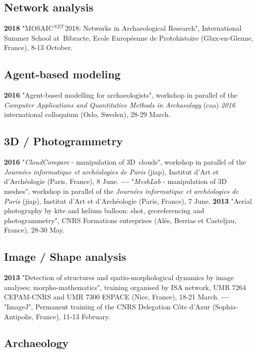 \documentclass[11pt]{report} %
\begin{document}
\subsection*{Network analysis}

\textbf{2018 }"MOSAIC${}^{NET\ }$2018: Networks in Archaeological Research", International Summer School at~Bibracte, Ecole Europ\'{e}enne de Protohistoire (Glux-en-Glenne, France), 8-13 October.

\subsection*{Agent-based modeling}

\textbf{2016 }"Agent-based modelling for archaeologists", workshop in parallel of the \textit{Computer Applications and Quantitative Methods in Archaeology }(caa) \textit{2016 }international colloquium (Oslo, Sweden), 28-29 March.

\subsection*{3D / Photogrammetry}

\textbf{2016 }"\textit{CloudCompare} - manipulation of 3D~clouds", workshop in parallel of the \textit{Journ\'{e}es informatique et arch\'{e}ologies de Paris} (jiap), Institut d'Art et d'Arch\'{e}ologie (Paris, France), 8 June.
\smallbreak
\textbf{---  }"\textit{MeshLab }- manipulation of 3D\textit{ }meshes", workshop in parallel of the \textit{Journ\'{e}es informatique et arch\'{e}ologies de Paris} (jiap), Institut d'Art et d'Arch\'{e}ologie (Paris, France), 7 June.
\smallbreak
\textbf{2013 }"Aerial photography by kite and helium balloon: shot, georeferencing and photogrammetry", CNRS Formations entreprises (Al\'{e}s, Berrias et Casteljau, France), 28-30 May.

\subsection*{Image / Shape analysis}

\textbf{2013 }"Detection of structures and spatio-morphological dynamics by image analyses: morpho-mathematics", training organised by ISA network, UMR 7264 CEPAM-CNRS and UMR 7300 ESPACE (Nice, France), 18-21 March.
\smallbreak
\textbf{---  }"ImageJ", Permanent training of the CNRS Delegation C\^{o}te d'Azur (Sophia-Antipolis, France), 11-13 February.

\subsection*{Archaeology}
\end{document}
